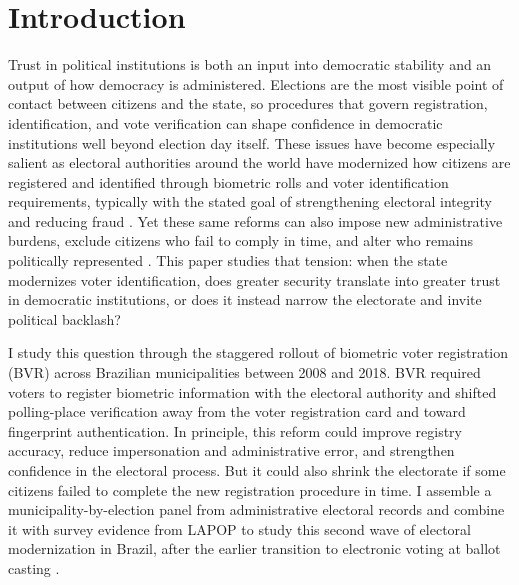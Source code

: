 \section{Introduction}
\label{sec:introduction}

Trust in political institutions is both an input into democratic stability and an output of how democracy is administered. Elections are the most visible point of contact between citizens and the state, so procedures that govern registration, identification, and vote verification can shape confidence in democratic institutions well beyond election day itself. These issues have become especially salient as electoral authorities around the world have modernized how citizens are registered and identified through biometric rolls and voter identification requirements, typically with the stated goal of strengthening electoral integrity and reducing fraud \citep{ideaBiometrics2017}. Yet these same reforms can also impose new administrative burdens, exclude citizens who fail to comply in time, and alter who remains politically represented \citep{ukECVoterID2024}. This paper studies that tension: when the state modernizes voter identification, does greater security translate into greater trust in democratic institutions, or does it instead narrow the electorate and invite political backlash?

I study this question through the staggered rollout of biometric voter registration (BVR) across Brazilian municipalities between 2008 and 2018. BVR required voters to register biometric information with the electoral authority and shifted polling-place verification away from the voter registration card and toward fingerprint authentication. In principle, this reform could improve registry accuracy, reduce impersonation and administrative error, and strengthen confidence in the electoral process. But it could also shrink the electorate if some citizens failed to complete the new registration procedure in time. I assemble a municipality-by-election panel from administrative electoral records and combine it with survey evidence from LAPOP to study this second wave of electoral modernization in Brazil, after the earlier transition to electronic voting at ballot casting \citep{Fujiwara2015VotingTechnoloPolitica}.

